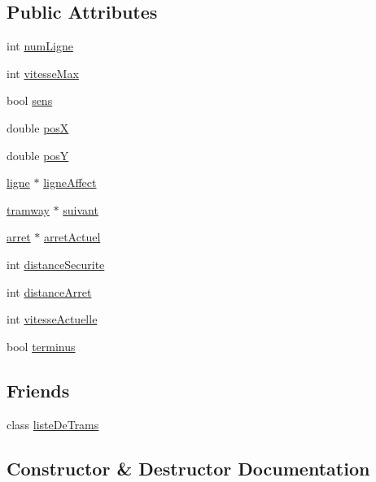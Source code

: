 \subsection*{Public Attributes}
\begin{DoxyCompactItemize}
\item 
int \hyperlink{classtramway_a937d549fcbdbe222ea08e4ec085bb19b}{num\+Ligne}
\item 
int \hyperlink{classtramway_a401f568b9c8cedcf0c359eb68ea8865d}{vitesse\+Max}
\item 
bool \hyperlink{classtramway_abc99be632a1ef40a7eae8bb46ac364f6}{sens}
\item 
double \hyperlink{classtramway_a0ba5b158240fe160ee8b91c74b4010f5}{posX}
\item 
double \hyperlink{classtramway_afb1214281e7e1b2c9a9fd9a5d322e836}{posY}
\item 
\hyperlink{classligne}{ligne} $\ast$ \hyperlink{classtramway_a0506569903981a08b8835a73fc49609b}{ligne\+Affect}
\item 
\hyperlink{classtramway}{tramway} $\ast$ \hyperlink{classtramway_a1ed327c50d74d61632664f0f460c6cf2}{suivant}
\item 
\hyperlink{classarret}{arret} $\ast$ \hyperlink{classtramway_a316032ab458b4ccf96b3f3f1bf327ee2}{arret\+Actuel}
\item 
int \hyperlink{classtramway_a59e30ad7e6df61e54fe2b326bd9e6134}{distance\+Securite}
\item 
int \hyperlink{classtramway_a85b44399cbbf04ec765d114465a4aa1f}{distance\+Arret}
\item 
int \hyperlink{classtramway_a5eab187ab73b4b91a158dc05fd8ed066}{vitesse\+Actuelle}
\item 
bool \hyperlink{classtramway_acfb0a0666823107c15ac26f074a67d79}{terminus}
\end{DoxyCompactItemize}
\subsection*{Friends}
\begin{DoxyCompactItemize}
\item 
class \hyperlink{classtramway_a769de17fc42804fb0d2a6751abb27e2f}{liste\+De\+Trams}
\end{DoxyCompactItemize}


\subsection{Constructor \& Destructor Documentation}
